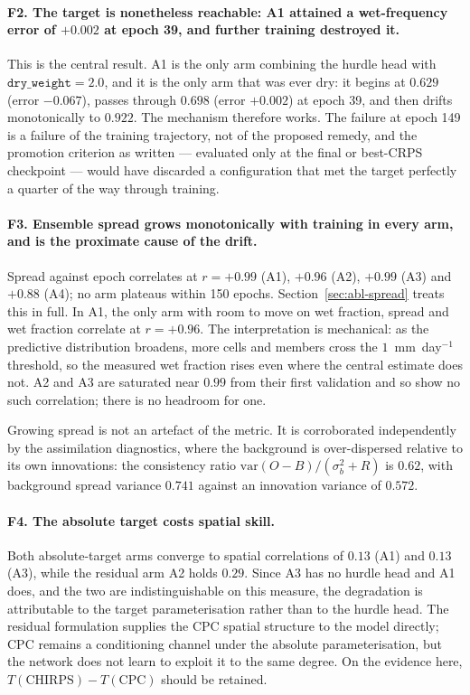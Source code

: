 \paragraph{F2. The target is nonetheless reachable: A1 attained a wet-frequency
error of $+0.002$ at epoch 39, and further training destroyed it.} This is the
central result. A1 is the only arm combining the hurdle head with
$\texttt{dry\_weight}=2.0$, and it is the only arm that was ever dry: it begins
at $0.629$ (error $-0.067$), passes through $0.698$ (error $+0.002$) at epoch
39, and then drifts monotonically to $0.922$. The mechanism therefore works. The
failure at epoch 149 is a failure of the training trajectory, not of the
proposed remedy, and the promotion criterion as written --- evaluated only at
the final or best-CRPS checkpoint --- would have discarded a configuration that
met the target perfectly a quarter of the way through training.

\paragraph{F3. Ensemble spread grows monotonically with training in every arm,
and is the proximate cause of the drift.} Spread against epoch correlates at
$r = +0.99$ (A1), $+0.96$ (A2), $+0.99$ (A3) and $+0.88$ (A4); no arm plateaus
within 150 epochs. Section~\ref{sec:abl-spread} treats this in full. In A1, the only arm with room to move on wet fraction, spread and wet
fraction correlate at $r = +0.96$. The interpretation is mechanical: as the
predictive distribution broadens, more cells and members cross the
$1$~mm~day$^{-1}$ threshold, so the measured wet fraction rises even where the
central estimate does not. A2 and A3 are saturated near $0.99$ from their first
validation and so show no such correlation; there is no headroom for one.

Growing spread is not an artefact of the metric. It is corroborated
independently by the assimilation diagnostics, where the background is
over-dispersed relative to its own innovations: the consistency ratio
$\mathrm{var}(O-B) / (\sigma_b^2 + R)$ is $0.62$, with background spread
variance $0.741$ against an innovation variance of $0.572$.

\paragraph{F4. The absolute target costs spatial skill.} Both absolute-target
arms converge to spatial correlations of $0.13$ (A1) and $0.13$ (A3), while the
residual arm A2 holds $0.29$. Since A3 has no hurdle head and A1 does, and the
two are indistinguishable on this measure, the degradation is attributable to
the target parameterisation rather than to the hurdle head. The residual
formulation supplies the CPC spatial structure to the model directly; CPC
remains a conditioning channel under the absolute parameterisation, but the
network does not learn to exploit it to the same degree. On the evidence here,
$T(\mathrm{CHIRPS}) - T(\mathrm{CPC})$ should be retained.

